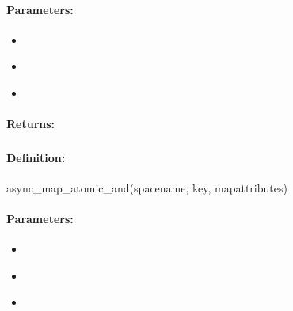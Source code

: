 \paragraph{Parameters:}
\begin{itemize}[noitemsep]
\item {}\\

\item {}\\

\item {}\\

\end{itemize}

\paragraph{Returns:}


\pagebreak
\subsubsection{}
\label{api:ruby:async_map_atomic_and}


\paragraph{Definition:}
\begin{rubycode}
async_map_atomic_and(spacename, key, mapattributes)
\end{rubycode}

\paragraph{Parameters:}
\begin{itemize}[noitemsep]
\item {}\\

\item {}\\

\item {}\\

\end{itemize}

